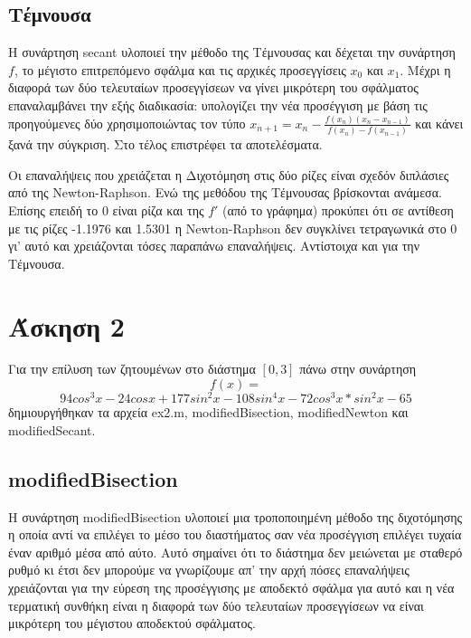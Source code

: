 \documentclass[a4paper,11pt]{article}
\begin{document}
\begin{flushleft}
\subsection*{Τέμνουσα}
Η συνάρτηση secant υλοποιεί την μέθοδο της Τέμνουσας και δέχεται την συνάρτηση $f$, το μέγιστο επιτρεπόμενο σφάλμα και τις αρχικές προσεγγίσεις $x_0$ και $x_1$. Μέχρι η διαφορά των δύο τελευταίων προσεγγίσεων να γίνει μικρότερη του σφάλματος επαναλαμβάνει την εξής διαδικασία: υπολογίζει την νέα προσέγγιση με βάση τις προηγούμενες δύο χρησιμοποιώντας τον τύπο $x_{n+1} = x_n-\frac{f(x_n)(x_n-x_{n-1})}{f(x_n)-f(x_{n-1})}$ και κάνει ξανά την σύγκριση. Στο τέλος επιστρέφει τα αποτελέσματα. \newline\newline


Οι επαναλήψεις που χρειάζεται η Διχοτόμηση στις δύο ρίζες είναι σχεδόν διπλάσιες από της Newton-Raphson. Ενώ της μεθόδου της Τέμνουσας βρίσκονται ανάμεσα.
Επίσης επειδή το 0 είναι ρίζα και της $f'$ (από το γράφημα) προκύπει ότι σε αντίθεση με τις ρίζες -1.1976 και 1.5301 η Newton-Raphson δεν συγκλίνει τετραγωνικά στο 0 γι' αυτό και χρειάζονται τόσες παραπάνω επαναλήψεις. Αντίστοιχα και για την Τέμνουσα.


\newpage

\section*{Άσκηση 2}

Για την επίλυση των ζητουμένων στο διάστημα $[0,3]$ πάνω στην συνάρτηση
$$f(x) = $$ $$94cos^3x-24cosx+177sin^2x-108sin^4x-72cos^3x*sin^2x-65$$
δημιουργήθηκαν τα αρχεία ex2.m, modifiedBisection, modifiedNewton και modifiedSecant.

\subsection*{modifiedBisection}
 Η συνάρτηση modifiedBisection υλοποιεί μια τροποποιημένη μέθοδο της διχοτόμησης η οποία αντί να επιλέγει το μέσο του διαστήματος σαν νέα προσέγγιση επιλέγει τυχαία έναν αριθμό μέσα από αύτο. Αυτό σημαίνει ότι το διάστημα δεν μειώνεται με σταθερό ρυθμό κι έτσι δεν μπορούμε να γνωρίζουμε απ' την αρχή πόσες επαναλήψεις χρειάζονται για την εύρεση της προσέγγισης με αποδεκτό σφάλμα για αυτό και η νέα τερματική συνθήκη είναι η διαφορά των δύο τελευταίων προσεγγίσεων να είναι μικρότερη του μέγιστου αποδεκτού σφάλματος.
\newline


\end{flushleft}
\end{document}
